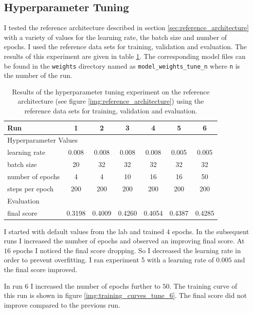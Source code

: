 \documentclass[11pt, onecolumn, oneside, reqno]{article}
\begin{document}
{{\subsection{Hyperparameter Tuning}
I tested the reference architecture described in section \ref{sec:reference_architecture} with a variety of values for the learning rate, the batch size and number of epochs. I used the reference data sets for training, validation and evaluation. The results of this experiment are given in table \ref{tbl:hyperparameter_tuning}. The corresponding model files can be found in the \texttt{weights} directory named as \texttt{model\_weights\_tune\_n} where \texttt{n} is the number of the run.

{\renewcommand{\arraystretch}{2}%
\begin{table}
\centering
\begin{tabular}{|l|c|c|c|c|c|c|}
\hline 
Run & 1 & 2 & 3 & 4 & 5 & 6 \\
\hline  
\multicolumn{7}{l}{Hyperparameter Values}\\
\hline
learning rate    & 0.008 & 0.008 & 0.008 & 0.008 & 0.005 & 0.005 \\
batch size       & 20    & 32    & 32    & 32    & 32    & 32    \\
number of epochs & 4     & 4     & 10    & 16    & 16    & 50    \\
steps per epoch  & 200   & 200   & 200   & 200   & 200   & 200   \\
\hline 
\multicolumn{7}{l}{Evaluation}\\
\hline
final score & 0.3198 & 0.4009 & 0.4260 & 0.4054 & 0.4387 & 0.4285 \\
\hline 
\end{tabular} 
\caption[Hyperparameter tuning experiment]{Results of the hyperparameter tuning experiment on the reference architecture (see figure \ref{img:reference_architecture}) using the reference data sets for training, validation and evaluation.}
\label{tbl:hyperparameter_tuning}
\end{table}

I started with default values from the lab and trained $4$ epochs. In the subsequent runs I increased the number of epochs and observed an improving final score. At $16$ epochs I noticed the final score dropping. So I decreased the learning rate in order to prevent overfitting. I ran experiment 5 with a learning rate of $0.005$ and the final score improved.

In run $6$ I increased the number of epochs further to $50$. The training curve of this run is shown in figure \ref{img:training_curves_tune_6}. The final score did not improve compared to the previous run.

}}}
\end{document}
